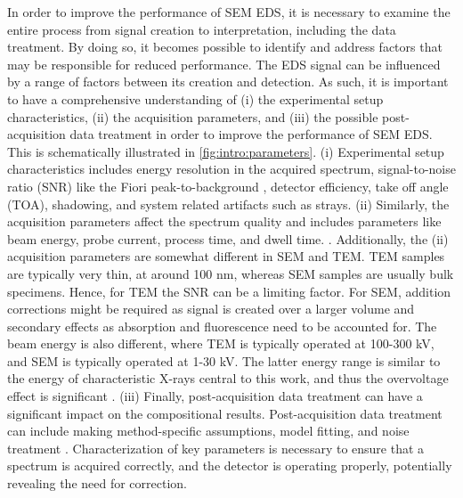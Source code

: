 In order to improve the performance of SEM EDS, it is necessary to examine the entire process from signal creation to interpretation, including the data treatment.
By doing so, it becomes possible to identify and address factors that may be responsible for reduced performance.
The EDS signal can be influenced by a range of factors between its creation and detection.
As such, it is important to have a comprehensive understanding of (i) the experimental setup characteristics, (ii) the acquisition parameters, and (iii) the possible post-acquisition data treatment in order to improve the performance of SEM EDS.
This is schematically illustrated in \cref{fig:intro:parameters}.
(i) Experimental setup characteristics includes energy resolution in the acquired spectrum, signal-to-noise ratio (SNR) like the Fiori peak-to-background \cite{fiori_peak_background_1982}, detector efficiency, take off angle (TOA), shadowing, and system related artifacts such as strays\cite{goldstein_scanning_2018}.
(ii) Similarly, the acquisition parameters affect the spectrum quality and includes parameters like beam energy, probe current, process time, and dwell time. \cite{goldstein_scanning_2018}. %
Additionally, the (ii) acquisition parameters are somewhat different in SEM and TEM.
TEM samples are typically very thin, at around 100 nm, whereas SEM samples are usually bulk specimens.
Hence, for TEM the SNR can be a limiting factor.
For SEM, addition corrections might be required as signal is created over a larger volume and secondary effects as absorption and fluorescence need to be accounted for.
The beam energy is also different, where TEM is typically operated at 100-300 kV, and SEM is typically operated at 1-30 kV.
The latter energy range is similar to the energy of characteristic X-rays central to this work, and thus the overvoltage effect is significant \cite{williams_carter_companion_volume_2016}.
(iii) Finally, post-acquisition data treatment can have a significant impact on the compositional results.
Post-acquisition data treatment can include making method-specific assumptions, model fitting, and noise treatment \cite{williams_carter_companion_volume_2016}.
Characterization of key parameters is necessary to ensure that a spectrum is acquired correctly, and the detector is operating properly, potentially revealing the need for correction.


